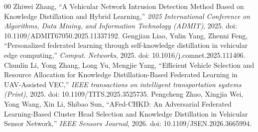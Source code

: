 \documentclass[journal]{IEEEtran}
\begin{document}
\begin{thebibliography}{00}
 Zhiwei Zhang, ``A Vehicular Network Intrusion Detection Method Based on Knowledge Distillation and Hybrid Learning,'' \emph{2025 International Conference on Algorithms, Data Mining, and Information Technology (ADMIT)}, 2025. doi: 10.1109/ADMIT67050.2025.11337192.
 Gengjian Liao, Yulin Yang, Zhenni Feng, ``Personalized federated learning through self-knowledge distillation in vehicular edge computing,'' \emph{Comput. Networks}, 2025. doi: 10.1016/j.comnet.2025.111406.
 Chunlin Li, Yong Zhang, Long Yu, Mengjie Yang, ``Efficient Vehicle Selection and Resource Allocation for Knowledge Distillation-Based Federated Learning in UAV-Assisted VEC,'' \emph{IEEE transactions on intelligent transportation systems (Print)}, 2025. doi: 10.1109/TITS.2025.3525735.
 Pengcheng Zhao, Xingjia Wei, Yong Wang, Xin Li, Shibao Sun, ``AFed-CHKD: An Adversarial Federated Learning-Based Cluster Head Selection and Knowledge Distillation in Vehicular Sensor Network,'' \emph{IEEE Sensors Journal}, 2026. doi: 10.1109/JSEN.2026.3665994.


\end{thebibliography}
\end{document}
